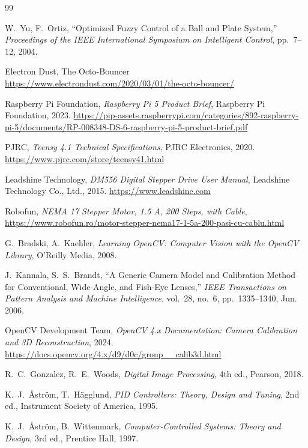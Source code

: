 \documentclass[12pt,a4paper]{report}
\begin{document}
\begin{thebibliography}{99}

W.~Yu, F.~Ortiz,
``Optimized Fuzzy Control of a Ball and Plate System,''
\textit{Proceedings of the IEEE International Symposium on Intelligent Control},
pp.~7--12, 2004.

Electron Dust, The Octo-Bouncer
\url{https://www.electrondust.com/2020/03/01/the-octo-bouncer/}

Raspberry Pi Foundation,
\textit{Raspberry Pi 5 Product Brief},
Raspberry Pi Foundation, 2023.
\url{https://pip-assets.raspberrypi.com/categories/892-raspberry-pi-5/documents/RP-008348-DS-6-raspberry-pi-5-product-brief.pdf}

PJRC,
\textit{Teensy 4.1 Technical Specifications},
PJRC Electronics, 2020.
\url{https://www.pjrc.com/store/teensy41.html}

Leadshine Technology,
\textit{DM556 Digital Stepper Drive User Manual},
Leadshine Technology Co., Ltd., 2015.
\url{https://www.leadshine.com}

Robofun,
\textit{NEMA 17 Stepper Motor, 1.5 A, 200 Steps, with Cable},
\url{https://www.robofun.ro/motor-stepper-nema17-1-5a-200-pasi-cu-cablu.html}

G.~Bradski, A.~Kaehler,
\textit{Learning OpenCV: Computer Vision with the OpenCV Library},
O'Reilly Media, 2008.

J.~Kannala, S.~S.~Brandt,
``A Generic Camera Model and Calibration Method for Conventional, Wide-Angle, and Fish-Eye Lenses,''
\textit{IEEE Transactions on Pattern Analysis and Machine Intelligence},
vol.~28, no.~6, pp.~1335--1340, Jun. 2006.

OpenCV Development Team,
\textit{OpenCV 4.x Documentation: Camera Calibration and 3D Reconstruction},
2024.
\url{https://docs.opencv.org/4.x/d9/d0c/group__calib3d.html}

R.~C.~Gonzalez, R.~E.~Woods,
\textit{Digital Image Processing}, 4th ed.,
Pearson, 2018.



K.~J.~Åström, T.~Hägglund,
\textit{PID Controllers: Theory, Design and Tuning}, 2nd ed.,
Instrument Society of America, 1995.

K.~J.~Åström, B.~Wittenmark,
\textit{Computer-Controlled Systems: Theory and Design}, 3rd ed.,
Prentice Hall, 1997.


\end{thebibliography}
\end{document}
